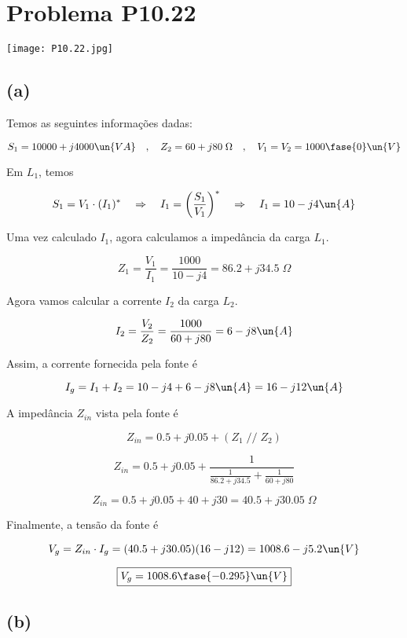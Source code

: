 
\section*{Problema P10.22}

\renewcommand*\thesection{10.22}

\begin{center}
    \texttt{[image: P10.22.jpg]}
\end{center}

\subsection*{(a)}

Temos as seguintes informações dadas:

\[ S_1 = 10000 + j4000 \un{VA} \quad , \quad Z_2 = 60 + j80 \;\Omega \quad , \quad V_1 = V_2 = 1000\fase{0} \un{V} \]

Em $L_1$, temos    

\[ S_1 = V_1 \cdot (I_1)^* \quad \Rightarrow \quad I_1 = \left(\frac{S_1}{V_1}\right)^* \quad \Rightarrow \quad I_1 = 10 -j4 \un{A}\]

Uma vez calculado $I_1$, agora calculamos a impedância da carga $L_1$.

\[ Z_1 = \frac{V_1}{I_1} = \frac{1000}{10 - j4} = 86.2 + j34.5 \;\Omega \]

Agora vamos calcular a corrente $I_2$ da carga $L_2$.

\[ I_2 = \frac{V_2}{Z_2} = \frac{1000}{60 + j80} = 6 - j8 \un{A}  \]

Assim, a corrente fornecida pela fonte é

\[ I_g = I_1 + I_2 = 10 -j4 +  6 - j8 \un{A} = 16 - j12 \un{A} \]

A impedância $Z_{in}$ vista pela fonte é

\[ Z_{in} = 0.5 + j0.05 + (Z_1 \; // \; Z_2) \]

\[ Z_{in} = 0.5 + j0.05 + \frac{1}{\frac{1}{86.2 + j34.5} + \frac{1}{60 + j80}} \]

\[ Z_{in} = 0.5 + j0.05 + 40 + j30 = 40.5 + j30.05 \;\Omega \]

Finalmente, a tensão da fonte é

\[ V_g = Z_{in} \cdot I_g = (40.5 + j30.05)(16 - j12) = 1008.6 - j5.2 \un{V}\]

\[ \boxed{V_g = 1008.6 \fase{-0.295}  \un{V}} \]

\subsection*{(b)}

